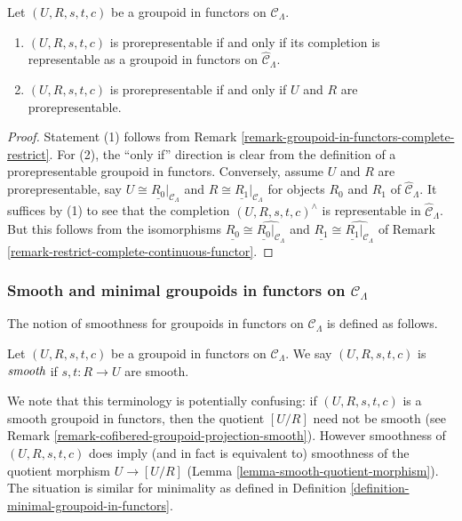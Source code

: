 \begin{lemma}
\label{lemma-groupoid-in-functors-prorep-equivalences}
Let $(U,R,s,t,c)$ be a groupoid in functors on $\mathcal C_{\Lambda}$.
\begin{enumerate}
\item $(U,R,s,t,c)$ is prorepresentable if and only if its completion is 
representable as a groupoid in functors on $\widehat{\mathcal C}_{\Lambda}$.
\item $(U,R,s,t,c)$ is prorepresentable if and only if $U$ and $R$ are 
prorepresentable.
\end{enumerate}
\end{lemma}

\begin{proof}
Statement (1) follows from Remark 
\ref{remark-groupoid-in-functors-complete-restrict}. For (2), the ``only if'' 
direction is clear from the definition of a prorepresentable groupoid in 
functors. Conversely, assume $U$ and $R$ are prorepresentable, say $U \cong 
\underline{R_0}|_{\mathcal C_{\Lambda}}$ and $R \cong 
\underline{R_1}|_{\mathcal C_{\Lambda}}$ for objects $R_0$ and $R_1$ of 
$\widehat{\mathcal C}_{\Lambda}$. It suffices by (1) to see that the completion 
$(U,R,s,t,c)^{\wedge}$ is representable in $\widehat{\mathcal C}_{\Lambda}$.  
But this follows from the isomorphisms $\underline{R_0} \cong 
\widehat{\underline{R_0}|_{\mathcal C_{\Lambda}}}$ and $\underline{R_1} \cong 
\widehat{\underline{R_1}|_{\mathcal C_{\Lambda}}}$ of Remark 
\ref{remark-restrict-complete-continuous-functor}.
\end{proof}

\subsubsection{Smooth and minimal groupoids in functors on $\mathcal 
C_{\Lambda}$}
The notion of smoothness for groupoids in functors on $\mathcal C_{\Lambda}$ is 
defined as follows.
\begin{definition}
Let $(U, R, s,t,c)$ be a groupoid in functors on $\mathcal C_{\Lambda}$.  We 
say $(U, R, s,t,c)$ is $\emph{smooth}$ if $s,t: R \rightarrow U$ are smooth.
\end{definition}

\begin{remark}
\label{remark-smooth-groupoid-in-functors-warning}
We note that this terminology is potentially confusing: if $(U, R, s,t,c)$ is a 
smooth groupoid in functors, then the quotient $[U/R]$ need not be smooth (see 
Remark \ref{remark-cofibered-groupoid-projection-smooth}).  However smoothness 
of $(U, R, s,t,c)$ does imply (and in fact is equivalent to) smoothness of the 
quotient morphism $U \rightarrow [U/R]$ (Lemma 
\ref{lemma-smooth-quotient-morphism}).  The situation is similar for minimality 
as defined in Definition \ref{definition-minimal-groupoid-in-functors}.
\end{remark}

